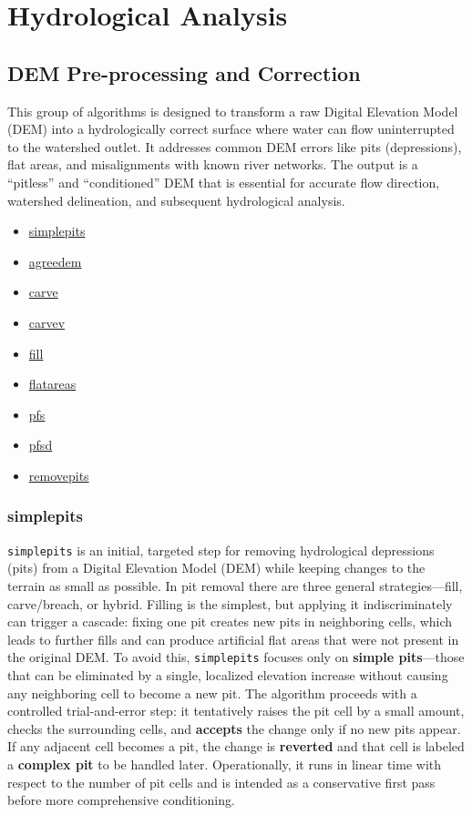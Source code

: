 \documentclass[
]{book}
\providecommand{\tightlist}{%
  \setlength{\itemsep}{0pt}\setlength{\parskip}{0pt}}
\theoremstyle{definition}
\theoremstyle{definition}
\theoremstyle{definition}
\theoremstyle{definition}
\theoremstyle{remark}
\begin{document}
\chapter{Hydrological Analysis}\label{hydrological-analysis}

\section{DEM Pre-processing and Correction}\label{DEM-Pre-processing-and-Correction}

This group of algorithms is designed to transform a raw Digital Elevation Model (DEM) into a hydrologically correct surface where water can flow uninterrupted to the watershed outlet. It addresses common DEM errors like pits (depressions), flat areas, and misalignments with known river networks. The output is a ``pitless'' and ``conditioned'' DEM that is essential for accurate flow direction, watershed delineation, and subsequent hydrological analysis.

\begin{itemize}
\tightlist
\item
  \hyperref[simplepits]{simplepits}
\item
  \hyperref[agreedem]{agreedem}
\item
  \hyperref[carve]{carve}
\item
  \hyperref[carvev]{carvev}
\item
  \hyperref[fill]{fill}
\item
  \hyperref[flatareas]{flatareas}
\item
  \hyperref[pfs]{pfs}
\item
  \hyperref[pfsd]{pfsd}
\item
  \hyperref[removepits]{removepits}
\end{itemize}

\subsection{simplepits}\label{simplepits}

\texttt{simplepits} is an initial, targeted step for removing hydrological depressions (pits) from a Digital Elevation Model (DEM) while keeping changes to the terrain as small as possible. In pit removal there are three general strategies---fill, carve/breach, or hybrid. Filling is the simplest, but applying it indiscriminately can trigger a cascade: fixing one pit creates new pits in neighboring cells, which leads to further fills and can produce artificial flat areas that were not present in the original DEM. To avoid this, \texttt{simplepits} focuses only on \textbf{simple pits}---those that can be eliminated by a single, localized elevation increase without causing any neighboring cell to become a new pit. The algorithm proceeds with a controlled trial-and-error step: it tentatively raises the pit cell by a small amount, checks the surrounding cells, and \textbf{accepts} the change only if no new pits appear. If any adjacent cell becomes a pit, the change is \textbf{reverted} and that cell is labeled a \textbf{complex pit} to be handled later. Operationally, it runs in linear time with respect to the number of pit cells and is intended as a conservative first pass before more comprehensive conditioning.
\end{document}
